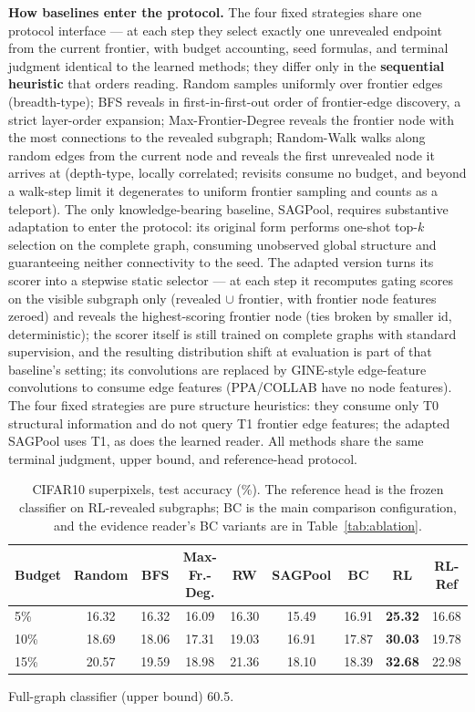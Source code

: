 \documentclass{article}
\begin{document}
\textbf{How baselines enter the protocol.} The four fixed strategies share one protocol interface --- at each step they select exactly one unrevealed endpoint from the current frontier, with budget accounting, seed formulas, and terminal judgment identical to the learned methods; they differ only in the \textbf{sequential heuristic} that orders reading. Random samples uniformly over frontier edges (breadth-type); BFS reveals in first-in-first-out order of frontier-edge discovery, a strict layer-order expansion; Max-Frontier-Degree reveals the frontier node with the most connections to the revealed subgraph; Random-Walk walks along random edges from the current node and reveals the first unrevealed node it arrives at (depth-type, locally correlated; revisits consume no budget, and beyond a walk-step limit it degenerates to uniform frontier sampling and counts as a teleport). The only knowledge-bearing baseline, SAGPool, requires substantive adaptation to enter the protocol: its original form performs one-shot top-$k$ selection on the complete graph, consuming unobserved global structure and guaranteeing neither connectivity to the seed. The adapted version turns its scorer into a stepwise static selector --- at each step it recomputes gating scores on the visible subgraph only (revealed $\cup$ frontier, with frontier node features zeroed) and reveals the highest-scoring frontier node (ties broken by smaller id, deterministic); the scorer itself is still trained on complete graphs with standard supervision, and the resulting distribution shift at evaluation is part of that baseline's setting; its convolutions are replaced by GINE-style edge-feature convolutions to consume edge features (PPA/COLLAB have no node features). The four fixed strategies are pure structure heuristics: they consume only T0 structural information and do not query T1 frontier edge features; the adapted SAGPool uses T1, as does the learned reader. All methods share the same terminal judgment, upper bound, and reference-head protocol.

\begin{table}[t]
\centering
\caption{CIFAR10 superpixels, test accuracy (\%). The reference head is the frozen classifier on RL-revealed subgraphs; BC is the main comparison configuration, and the evidence reader's BC variants are in Table~\ref{tab:ablation}.}
\label{tab:cifar10}
\begin{tabular}{lcccccccc}
\toprule
Budget & Random & BFS & Max-Fr.-Deg. & RW & SAGPool & BC & RL & RL-Ref \\
\midrule
5\%  & 16.32 & 16.32 & 16.09 & 16.30 & 15.49 & 16.91 & \textbf{25.32} & 16.68 \\
10\% & 18.69 & 18.06 & 17.31 & 19.03 & 16.91 & 17.87 & \textbf{30.03} & 19.78 \\
15\% & 20.57 & 19.59 & 18.98 & 21.36 & 18.10 & 18.39 & \textbf{32.68} & 22.98 \\
\bottomrule
\end{tabular}

\smallskip
{\footnotesize Full-graph classifier (upper bound) 60.5.}
\end{table}
\end{document}
